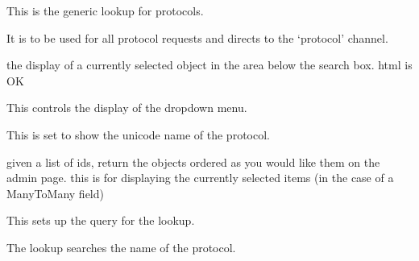 \documentclass[letterpaper,10pt,english]{sphinxmanual}
\begin{document}

\begin{fulllineitems}
\label{api:experimentdb.data.lookups.ProtocolLookup}
This is the generic lookup for protocols.


It is to be used for all protocol requests and directs to the `protocol' channel.


\begin{fulllineitems}
\label{api:experimentdb.data.lookups.ProtocolLookup.format_item}
the display of a currently selected object in the area below the search box. html is OK


\end{fulllineitems}


\begin{fulllineitems}
\label{api:experimentdb.data.lookups.ProtocolLookup.format_result}
This controls the display of the dropdown menu.


This is set to show the unicode name of the protocol.


\end{fulllineitems}


\begin{fulllineitems}
\label{api:experimentdb.data.lookups.ProtocolLookup.get_objects}
given a list of ids, return the objects ordered as you would like them on the admin page.
this is for displaying the currently selected items (in the case of a ManyToMany field)


\end{fulllineitems}


\begin{fulllineitems}
\label{api:experimentdb.data.lookups.ProtocolLookup.get_query}
This sets up the query for the lookup.


The lookup searches the name of the protocol.


\end{fulllineitems}


\end{fulllineitems}
\end{document}
